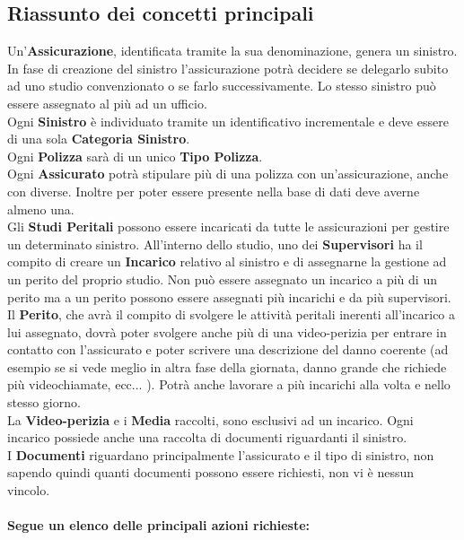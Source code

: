 \documentclass[a4paper,12pt]{report}
\begin{document}
\subsection{Riassunto dei concetti principali}

Un’\textbf{Assicurazione}, identificata tramite la sua denominazione, genera un sinistro. In fase di creazione del sinistro l’assicurazione potrà decidere se delegarlo subito ad uno studio convenzionato o se farlo successivamente. Lo stesso sinistro può essere assegnato al più ad un ufficio.
\\
Ogni \textbf{Sinistro} è individuato tramite un identificativo incrementale e deve essere di una sola \textbf{Categoria Sinistro}.
\\
Ogni \textbf{Polizza} sarà di un unico \textbf{Tipo Polizza}.
\\
Ogni \textbf{Assicurato} potrà stipulare più di una polizza con un’assicurazione, anche con diverse. Inoltre per poter essere  presente nella base di dati deve averne almeno una.
\\
Gli \textbf{Studi Peritali} possono essere incaricati da tutte le assicurazioni per gestire un determinato sinistro. All’interno dello studio, uno dei \textbf{Supervisori} ha il compito di creare un \textbf{Incarico} relativo al sinistro e di assegnarne la gestione ad un perito del proprio studio.
Non può essere assegnato un incarico a più di un perito ma a un perito possono essere assegnati più incarichi e da più supervisori.
\\
Il \textbf{Perito}, che avrà il compito di svolgere le attività peritali inerenti all’incarico a lui assegnato, dovrà poter svolgere anche più di una video-perizia per entrare in contatto con l’assicurato e poter scrivere una descrizione del danno coerente (ad esempio se si vede meglio in altra fase della giornata, danno grande che richiede più videochiamate, ecc... ).
Potrà anche lavorare a più incarichi alla volta e nello stesso giorno.
\\
La \textbf{Video-perizia} e i \textbf{Media} raccolti, sono esclusivi ad un incarico.
Ogni incarico possiede anche una raccolta di documenti riguardanti il sinistro.
\\
I \textbf{Documenti} riguardano principalmente l’assicurato e il tipo di sinistro, non sapendo quindi quanti documenti possono essere richiesti, non vi è nessun vincolo.
\\
\\
\textbf{Segue un elenco delle principali azioni richieste:}
\end{document}
